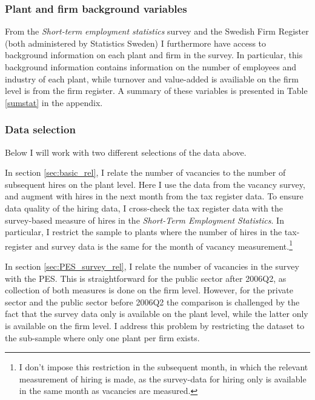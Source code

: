 \subsubsection{Plant and firm background variables}

From the \emph{Short-term employment statistics} survey and the Swedish Firm Register (both administered by Statistics Sweden) I furthermore have access to background information on each plant and firm in the survey. In particular, this background information contains information on the number of employees and industry of each plant, while turnover and value-added is availiable on the firm level is from the firm register. A summary of these variables is presented in Table \ref{sumstat} in the appendix. 

\subsubsection{Data selection}

Below I will work with two different selections of the data above. 

In section \ref{sec:basic_rel}, I relate the number of vacancies to the number of subsequent hires on the plant level. Here I use the data from the vacancy survey, and augment with hires in the next month from the tax register data. To ensure data quality of the hiring data, I cross-check the tax register data with the survey-based measure of hires in the \emph{Short-Term Employment Statistics}. In particular, I restrict the sample to plants where the number of hires in the tax-register and survey data is the same for the month of vacancy measurement.\footnote{I don't impose this restriction in the subsequent month, in which the relevant measurement of hiring is made, as the survey-data for hiring only is available in the same month as vacancies are measured.} 

In section \ref{sec:PES_survey_rel}, I relate the number of vacancies in the survey with the PES. This is straightforward for the public sector after 2006Q2, as collection of both measures is done on the firm level. However, for the private sector and the public sector before 2006Q2 the comparison is challenged by the fact that the survey data only is available on the plant level, while the latter only is available on the firm level. I address this problem by restricting the dataset to the sub-sample where only one plant per firm exists. 
 

